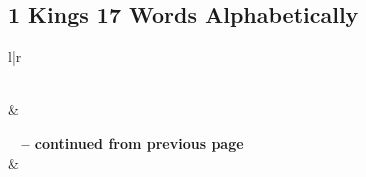

\subsection{1 Kings 17 Words Alphabetically}


\normalsize
 
\begin{center}
\begin{longtable}{l|r}
\caption[1 Kings 17 Words Alphabetically]{1 Kings 17 Words Alphabetically}\label{table:WordsAlphabetically for 1 Kings 17} \\
\hline {} &  \\ \hline 
\endfirsthead
 
{{\bfseries \tablename\ \thetable{} -- continued from previous page}} \\  
\hline {} &  \\ \hline 
\endhead
 

\end{longtable}
\end{center}
